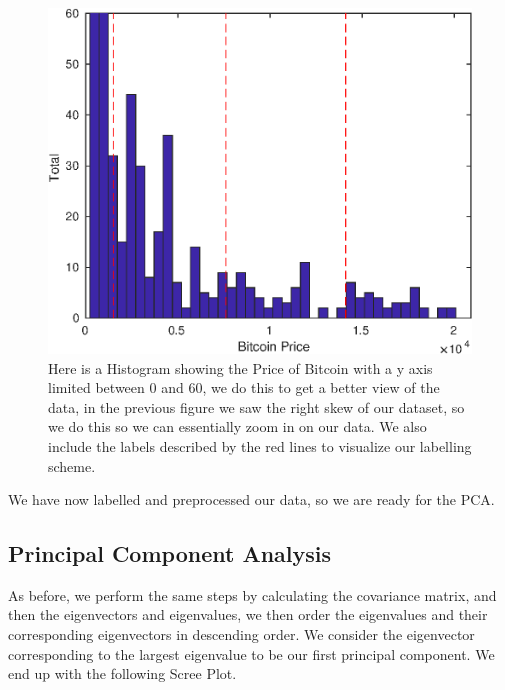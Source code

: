 \documentclass{article}
\begin{document}
\begin{figure}[H]
\centering
\caption{Here is a Histogram showing the Price of Bitcoin with a y axis limited between 0 and 60, we do this to get a better view of the data, in the previous figure we saw the right skew of our dataset, so we do this so we can essentially zoom in on our data. We also include the labels described by the red lines to visualize our labelling scheme.}
\includegraphics[scale=0.8]{final/btc_price_withLabel.eps}
\end{figure}

We have now labelled and preprocessed our data, so we are ready for the PCA.

\subsection{Principal Component Analysis}
As before, we perform the same steps by calculating the covariance matrix, and then the eigenvectors and eigenvalues, we then order the eigenvalues and their corresponding eigenvectors in descending order. We consider the eigenvector corresponding to the largest eigenvalue to be our first principal component. We end up with the following Scree Plot.
\end{document}
